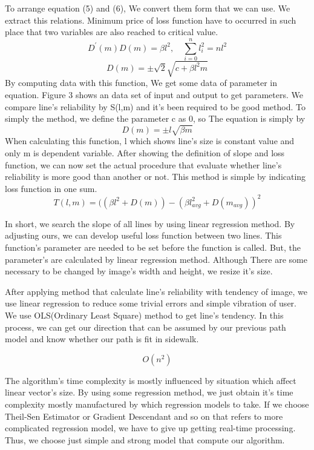 To arrange equation (5) and (6), We convert them form that we can use. We extract this relations. Minimum price of loss function have to occurred in such place that two variables are also reached to critical value.
\begin{equation}
\mathit{{D}^{\prime}(m)D(m) = \beta{l}^{2},\quad\sum_{i=0}^{n}{{l}_{i}^{2}} = n{l}^{2}}
\end{equation}
\begin{equation}
\mathit{D(m)=\pm\sqrt{2}\sqrt{c+\beta{l}^{2}m}}
\end{equation}
By computing data with this function, We get some data of parameter in equation. Figure 3 shows an data set of input and output to get parameters. We compare line's reliability by S(l,m) and it's been required to be good method. To simply the method, we define the parameter c as 0, so The equation is simply by
\begin{equation}
\mathit{D(m)=\pm l\sqrt{\beta m}}
\end{equation}
When calculating this function, l which shows line's size is constant value and only m is dependent variable. After showing the definition of slope and loss function, we can now set the actual procedure that evaluate whether line's reliability is more good than another or not. This method is simple by indicating loss function in one sum.
\begin{equation}
\mathit{T(l,m) = ((\beta l^{2}+D(m)) - (\beta {l}_{avg}^{2}+D(m_{avg}))^{2}}
\end{equation}

In short, we search the slope of all lines by using linear regression method. By adjusting ours, we can develop useful loss function between two lines. This function's parameter are needed to be set before the function is called. But, the parameter's are calculated by linear regression method. Although There are some necessary to be changed by image's width and height, we resize it's size.\quad
 
After applying method that calculate line's reliability with tendency of image, we use linear regression to reduce some trivial errors and simple vibration of user. We use OLS(Ordinary Least Square) method to get line's tendency. In this process, we can get our direction that can be assumed by our previous path model and know whether our path is fit in sidewalk. 

\begin{equation}
\mathit{O(n^2)}
\end{equation}

The algorithm's time complexity is mostly influenced by situation which affect linear vector's size. By using some regression method, we just obtain it's time complexity mostly manufactured by which regression models to take. If we choose Theil-Sen Estimator or Gradient Descendant and so on that refers to more complicated regression model, we have to give up getting real-time processing. Thus, we choose just simple and strong model that compute our algorithm.